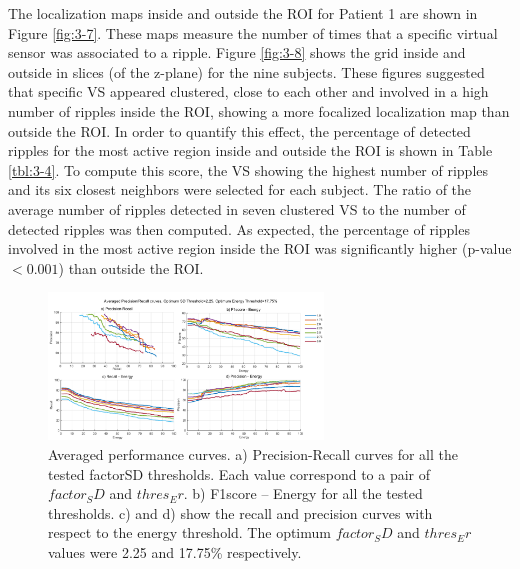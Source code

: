 The localization maps inside and outside the ROI for Patient 1 are shown in Figure \ref{fig:3-7}. These maps measure the number of times that a specific virtual sensor was associated to a ripple. Figure \ref{fig:3-8} shows the grid inside and outside in slices (of the z-plane) for the nine subjects. These figures suggested that specific VS appeared clustered, close to each other and involved in a high number of ripples inside the ROI, showing a more focalized localization map than outside the ROI. In order to quantify this effect, the percentage of detected ripples for the most active region inside and outside the ROI is shown in Table \ref{tbl:3-4}. To compute this score, the VS showing the highest number of ripples and its six closest neighbors were selected for each subject. The ratio of the average number of ripples detected in seven clustered VS to the number of detected ripples was then computed. As expected, the percentage of ripples involved in the most active region inside the ROI was significantly higher (p-value$<0.001$) than outside the ROI. 

\begin{figure}[h]
\centering
\includegraphics[width=0.65\textwidth]{Images/fig3-5.png}
\caption{Averaged performance curves. a) Precision-Recall curves for all the tested factorSD thresholds. Each value correspond to a pair of $factor_SD$ and $thres_Er$. b) F1score – Energy for all the tested thresholds. c) and d) show the recall and precision curves with respect to the energy threshold. The optimum $factor_SD$ and $thres_Er$ values were 2.25 and 17.75\% respectively.}
\label{fig:3-5}
\end{figure}

